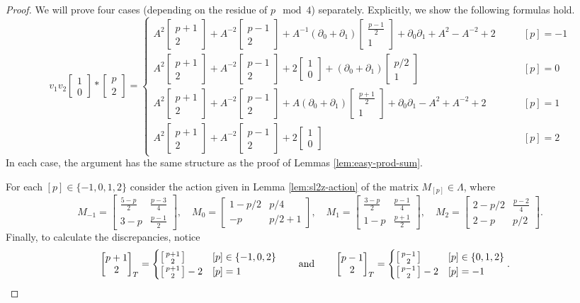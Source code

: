 \documentclass{article}
\newcommand{\del}{\partial}
\newcommand{\twos}[2]{\left[\begin{smallmatrix}#1\\#2\end{smallmatrix}\right]}
\newcommand{\two}[2]{\begin{bmatrix}#1\\#2\end{bmatrix}}
\theoremstyle{definition}
\begin{document}
\begin{proof}
    We will prove four cases (depending on the residue of $p\mod 4$) separately. Explicitly, we show the following formulas hold.
    \[
    v_1v_2\two{1}{0}*\two{p}{2}=
    \begin{cases}
       A^2\twos{p+1}{2}+A^{-2}\twos{p-1}{2}+A^{-1}(\del_0+\del_1)\twos{\frac{p-1}{2}}{1}+\del_0\del_1+A^2-A^{-2}+2&\qquad[p]=-1\\
       A^2\twos{p+1}{2}+A^{-2}\twos{p-1}{2}+2\twos{1}{0}+(\del_0+\del_1)\twos{p/2}{1}&\qquad[p]=0\\
       A^2\twos{p+1}{2}+A^{-2}\twos{p-1}{2}+A(\del_0+\del_1)\twos{\frac{p+1}{2}}{1}+\del_0\del_1-A^2+A^{-2}+2 &\qquad[p]=1\\
       A^2\twos{p+1}{2}+A^{-2}\twos{p-1}{2}+2\twos{1}{0}&\qquad[p]=2
    \end{cases}
    \]
    In each case, the argument has the same structure as the proof of Lemmas \ref{lem:easy-prod-sum}.

    For each $[p]\in \{-1,0,1,2\}$ consider the action given in Lemma \ref{lem:sl2z-action} of the matrix $M_{[p]}\in \Lambda$, where
    \[
    M_{-1}=\begin{bmatrix}
        \frac{5-p}{2}&\frac{p-3}{4}\\
        3-p& \frac{p-1}{2}
    \end{bmatrix},\quad
    M_0=\begin{bmatrix}
        1-p/2&p/4\\
        -p&p/2+1
    \end{bmatrix},\quad
    M_1=\begin{bmatrix}
        \frac{3-p}{2}&\frac{p-1}{4}\\
        1-p&\frac{p+1}{2}
    \end{bmatrix},\quad
    M_2=\begin{bmatrix}
        2-p/2&\frac{p-2}{4}\\
        2-p&p/2
    \end{bmatrix}.
    \]
    Finally, to calculate the discrepancies, notice
    \begin{align*}
        \two{p+1}{2}_T&=\begin{cases}
            \twos{p+1}{2} & [p]\in \{-1,0,2\}\\
            \twos{p+1}{2}-2& [p]=1
        \end{cases}\qquad\text{and}\qquad
        \two{p-1}{2}_T=\begin{cases}
            \twos{p-1}{2} & [p]\in \{0,1,2\}\\
            \twos{p-1}{2}-2& [p]=-1
        \end{cases}.\qedhere
    \end{align*}
\end{proof}
\end{document}
